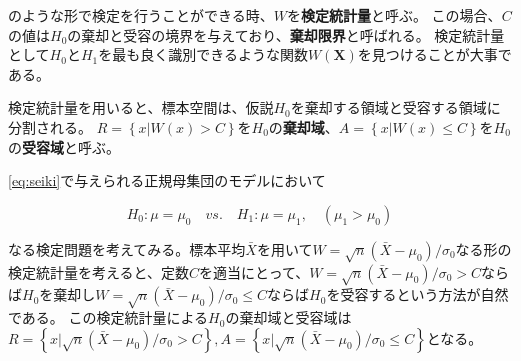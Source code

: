 \documentclass{article}
\begin{document}
のような形で検定を行うことができる時、$W$を\textbf{検定統計量}と呼ぶ。
この場合、$C$の値は$H_0$の棄却と受容の境界を与えており、\textbf{棄却限界}と呼ばれる。
検定統計量として$H_0$と$H_1$を最も良く識別できるような関数$W(\bm{X})$を見つけることが大事である。

検定統計量を用いると、標本空間は、仮説$H_0$を棄却する領域と受容する領域に分割される。
$R=\left\{x|W(x)>C\right\}$を$H_0$の\textbf{棄却域}、$A=\left\{x|W(x) \leq C\right\}$を$H_0$の\textbf{受容域}と呼ぶ。

\eqref{eq:seiki}で与えられる正規母集団のモデルにおいて

$$
H_0: \mu = \mu_0 \quad vs. \quad H_1: \mu = \mu_1,\quad (\mu_1 > \mu_0)
$$

なる検定問題を考えてみる。標本平均$\bar{X}$を用いて$W=\sqrt{n}(\bar{X}-\mu_0)/\sigma_0$なる形の検定統計量を考えると、定数$C$を適当にとって、$W=\sqrt{n}(\bar{X}-\mu_0)/\sigma_0>C$ならば$H_0$を棄却し$W=\sqrt{n}(\bar{X}-\mu_0)/\sigma_0\leq C$ならば$H_0$を受容するという方法が自然である。
この検定統計量による$H_0$の棄却域と受容域は$R=\left\{x|\sqrt{n}(\bar{X}-\mu_0)/\sigma_0>C\right\}, A=\left\{x|\sqrt{n}(\bar{X}-\mu_0)/\sigma_0 \leq C\right\} $となる。
\end{document}
